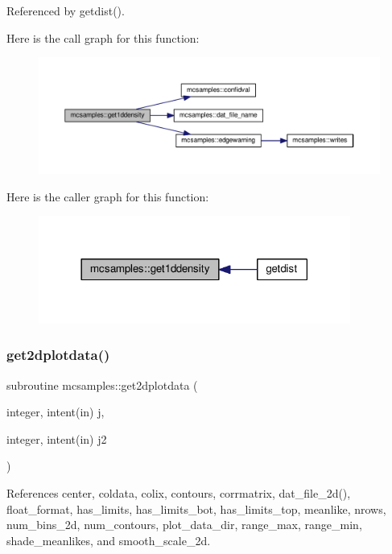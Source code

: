 Referenced by getdist().

Here is the call graph for this function\+:
\nopagebreak
\begin{figure}[H]
\begin{center}
\leavevmode
\includegraphics[width=350pt]{namespacemcsamples_a9bbfd241a96107124f0af5ef8d0fbe61_cgraph}
\end{center}
\end{figure}
Here is the caller graph for this function\+:
\nopagebreak
\begin{figure}[H]
\begin{center}
\leavevmode
\includegraphics[width=290pt]{namespacemcsamples_a9bbfd241a96107124f0af5ef8d0fbe61_icgraph}
\end{center}
\end{figure}
\mbox{\label{namespacemcsamples_a67c86279d2ba781324578c13807fa812}} 
\subsubsection{\texorpdfstring{get2dplotdata()}{get2dplotdata()}}
{\footnotesize\ttfamily subroutine mcsamples\+::get2dplotdata (\begin{DoxyParamCaption}\item[{integer, intent(in)}]{j,  }\item[{integer, intent(in)}]{j2 }\end{DoxyParamCaption})}



References center, coldata, colix, contours, corrmatrix, dat\+\_\+file\+\_\+2d(), float\+\_\+format, has\+\_\+limits, has\+\_\+limits\+\_\+bot, has\+\_\+limits\+\_\+top, meanlike, nrows, num\+\_\+bins\+\_\+2d, num\+\_\+contours, plot\+\_\+data\+\_\+dir, range\+\_\+max, range\+\_\+min, shade\+\_\+meanlikes, and smooth\+\_\+scale\+\_\+2d.



